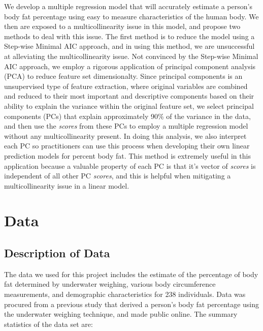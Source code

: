 \documentclass[letterpaper, 12pt]{article}
\begin{document}
	We develop a multiple regression model that will accurately estimate a person's body fat percentage using easy to measure characteristics of the human body.  We then are exposed to a multicollinearity issue in this model, and propose two methods to deal with this issue.  The first method is to reduce the model using a Step-wise Minimal AIC approach, and in using this method, we are unsuccessful at alleviating the multicollinearity issue.  Not convinced by the Step-wise Minimal AIC approach, we employ a rigorous application of principal component analysis (PCA) to reduce feature set dimensionalty.  Since principal components is an unsupervised type of feature extraction, where original variables are combined and reduced to their most important and descriptive components based on their ability to explain the variance within the original feature set, we select principal components (PCs) that explain approximately 90\% of the variance in the data, and then use the \textit{scores} from these PCs to employ a multiple regression model without any multicollinearity present.  In doing this analysis, we also interpret each PC so practitioners can use this process when developing their own linear prediction models for percent body fat.  This method is extremely useful in this application because a valuable property of each PC is that it's vector of \textit{scores} is independent of all other PC \textit{scores}, and this is helpful when mitigating a multicollinearity issue in a linear model.
	
	\section{Data}
	\subsection*{Description of Data}
	
	The data we used for this project includes the estimate of the percentage of body fat determined by underwater weighing, various body circumference measurements, and demographic characteristics for 238 individuals.  Data was procured from a previous study that derived a person's body fat percentage using the underwater weighing technique, and made public online.  The summary statistics of the data set are:
	
\end{document}
